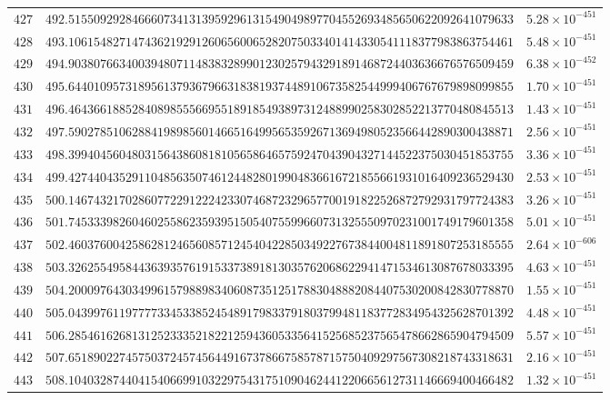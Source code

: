 \documentclass[12pt,reqno]{amsart}
\theoremstyle{remark}
\begin{document}
\begin{longtable}{clc}
$427$ & $492.5155092928466607341313959296131549049897704552693485650622092641079633$ & $5.28\times 10^{-451}$ \\
$428$ & $493.1061548271474362192912606560065282075033401414330541118377983863754461$ & $5.48\times 10^{-451}$ \\
$429$ & $494.9038076634003948071148383289901230257943291891468724403636676576509459$ & $6.38\times 10^{-452}$ \\
$430$ & $495.6440109573189561379367966318381937448910673582544999406767679898099855$ & $1.70\times 10^{-451}$ \\
$431$ & $496.4643661885284089855566955189185493897312488990258302852213770480845513$ & $1.43\times 10^{-451}$ \\
$432$ & $497.5902785106288419898560146651649956535926713694980523566442890300438871$ & $2.56\times 10^{-451}$ \\
$433$ & $498.3994045604803156438608181056586465759247043904327144522375030451853755$ & $3.36\times 10^{-451}$ \\
$434$ & $499.4274404352911048563507461244828019904836616721855661931016409236529430$ & $2.53\times 10^{-451}$ \\
$435$ & $500.1467432170286077229122242330746872329657700191822526872792931797724383$ & $3.26\times 10^{-451}$ \\
$436$ & $501.7453339826046025586235939515054075599660731325550970231001749179601358$ & $5.01\times 10^{-451}$ \\
$437$ & $502.4603760042586281246560857124540422850349227673844004811891807253185555$ & $2.64\times 10^{-606}$ \\
$438$ & $503.3262554958443639357619153373891813035762068622941471534613087678033395$ & $4.63\times 10^{-451}$ \\
$439$ & $504.2000976430349961579889834060873512517883048882084407530200842830778870$ & $1.55\times 10^{-451}$ \\
$440$ & $505.0439976119777733453385245489179833791803799481183772834954325628701392$ & $4.48\times 10^{-451}$ \\
$441$ & $506.2854616268131252333521822125943605335641525685237565478662865904794509$ & $5.57\times 10^{-451}$ \\
$442$ & $507.6518902274575037245745644916737866758578715750409297567308218743318631$ & $2.16\times 10^{-451}$ \\
$443$ & $508.1040328744041540669910322975431751090462441220665612731146669400466482$ & $1.32\times 10^{-451}$ \\

\end{longtable}
\end{document}
